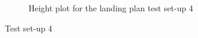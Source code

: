 \begin{figure}[H]
\begin{subfigure}{0.7\textwidth}
\caption{Height plot for the landing plan test set-up 4}
\label{Fig:Height31mai131844}
\end{subfigure}
\caption{Test set-up 4}
\label{Fig:Test4}
\end{figure}

